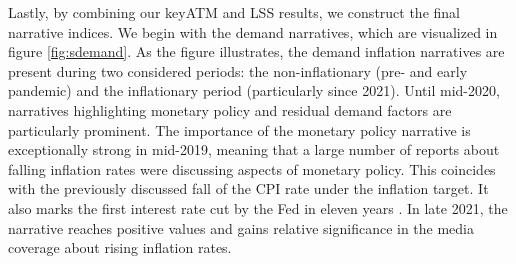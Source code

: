 Lastly, by combining our \textsf{keyATM} and \textsf{LSS} results, we construct the final narrative indices. We begin with the demand narratives, which are visualized in figure \ref{fig:sdemand}. As the figure illustrates, the demand inflation narratives are present during two considered periods: the non-inflationary (pre- and early pandemic) and the inflationary period (particularly since 2021). Until mid-2020, narratives highlighting monetary policy and residual demand factors are particularly prominent. The importance of the monetary policy narrative is exceptionally strong in mid-2019, meaning that a large number of reports about falling inflation rates were discussing aspects of monetary policy. This coincides with the previously discussed fall of the CPI rate under the inflation target. It also marks the first interest rate cut by the Fed in eleven years \citep{fed.2019}. In late 2021, the narrative reaches positive values and gains relative significance in the media coverage about rising inflation rates.
